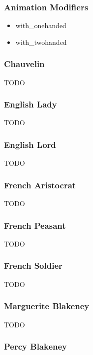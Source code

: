 \subsubsection{Animation Modifiers}

\begin{itemize}

\item with\_onehanded
\item with\_twohanded

\end{itemize}

\subsubsection{Chauvelin}

TODO

\subsubsection{English Lady}

TODO

\subsubsection{English Lord}

TODO

\subsubsection{French Aristocrat}

TODO

\subsubsection{French Peasant}

TODO

\subsubsection{French Soldier}

TODO

\subsubsection{Marguerite Blakeney}

TODO

\subsubsection{Percy Blakeney}

